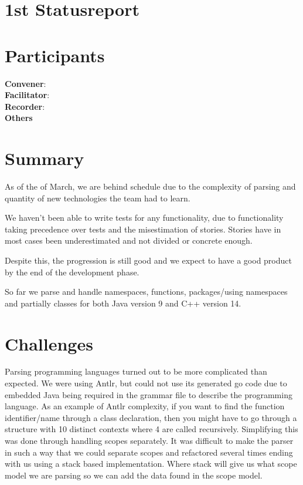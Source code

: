 \section*{1st Statusreport}

\section*{Participants}

\textbf{Convener}: \groupleader{}     \\
\textbf{Facilitator}: \facilitator{}  \\ 
\textbf{Recorder}: \scrummaster{}   \\ 
\textbf{Others}                    \\

\section*{Summary}
As of the  of March, we are behind schedule due to the complexity of parsing and quantity of new technologies the team had to learn. 

We haven't been able to write tests for any functionality, due to functionality taking precedence over tests and the misestimation of stories. Stories have in most cases been underestimated and not divided or concrete enough. 

Despite this, the progression is still good and we expect to have a good product by the end of the development phase. 

So far we parse and handle namespaces, functions, packages/using namespaces and partially classes for both Java version 9 and C++ version 14.

\section*{Challenges}
Parsing programming languages turned out to be more complicated than expected. We were using Antlr, but could not use its generated go code due to embedded Java being required in the grammar file to describe the programming language. As an example of Antlr complexity, if you want to find the function identifier/name through a class declaration, then you might have to go through a structure with 10 distinct contexts where 4 are called recursively. Simplifying this was done through handling scopes separately. It was difficult to make the parser in such a way that we could separate scopes and refactored several times ending with us using a stack based implementation. Where stack will give us what scope model we are parsing so we can add the data found in the scope model.

